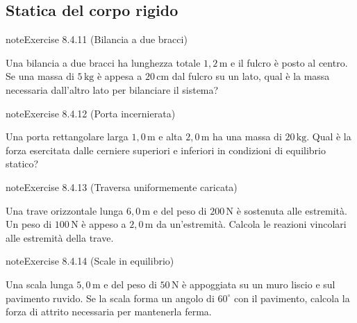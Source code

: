 \documentclass[letterpaper,10pt,italian]{jupyterBook}
\begin{document}
\subsection{Statica del corpo rigido}
\label{\detokenize{ch/mechanics/statics-problems:statica-del-corpo-rigido}} \label{exercise:ch/mechanics/statics-problems-exercise-10}

\begin{sphinxadmonition}{note}{Exercise 8.4.11 (Bilancia a due bracci)}



\sphinxAtStartPar
Una bilancia a due bracci ha lunghezza totale \(1,2 \, \text{m}\) e il fulcro è posto al centro. Se una massa di \(5 \, \text{kg}\) è appesa a \(20 \, \text{cm}\) dal fulcro su un lato, qual è la massa necessaria dall’altro lato per bilanciare il sistema?
\end{sphinxadmonition}
 \label{exercise:ch/mechanics/statics-problems-exercise-11}

\begin{sphinxadmonition}{note}{Exercise 8.4.12 (Porta incernierata)}



\sphinxAtStartPar
Una porta rettangolare larga \(1,0 \, \text{m}\) e alta \(2,0 \, \text{m}\) ha una massa di \(20 \, \text{kg}\). Qual è la forza esercitata dalle cerniere superiori e inferiori in condizioni di equilibrio statico?
\end{sphinxadmonition}
 \label{exercise:ch/mechanics/statics-problems-exercise-12}

\begin{sphinxadmonition}{note}{Exercise 8.4.13 (Traversa uniformemente caricata)}



\sphinxAtStartPar
Una trave orizzontale lunga \(6,0 \, \text{m}\) e del peso di \(200 \, \text{N}\) è sostenuta alle estremità. Un peso di \(100 \, \text{N}\) è appeso a \(2,0 \, \text{m}\) da un’estremità. Calcola le reazioni vincolari alle estremità della trave.
\end{sphinxadmonition}
 \label{exercise:ch/mechanics/statics-problems-exercise-13}

\begin{sphinxadmonition}{note}{Exercise 8.4.14 (Scale in equilibrio)}



\sphinxAtStartPar
Una scala lunga \(5,0 \, \text{m}\) e del peso di \(50 \, \text{N}\) è appoggiata su un muro liscio e sul pavimento ruvido. Se la scala forma un angolo di \(60^\circ\) con il pavimento, calcola la forza di attrito necessaria per mantenerla ferma.
\end{sphinxadmonition}
 \label{exercise:ch/mechanics/statics-problems-exercise-14}
\end{document}
